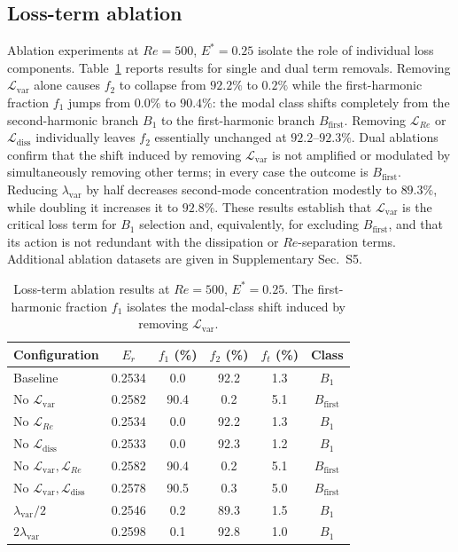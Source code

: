 \documentclass[a4paper,11pt]{article}
\begin{document}
\subsection{Loss-term ablation}
\label{sec:ablation}

Ablation experiments at \(Re=500\), \(E^*=0.25\) isolate the role of individual
loss components. Table~\ref{tab:loss_ablation} reports results for single and dual
term removals. Removing \(\mathcal{L}_{\mathrm{var}}\) alone causes \(f_2\) to
collapse from \(92.2\%\) to \(0.2\%\) while the first-harmonic fraction \(f_1\)
jumps from \(0.0\%\) to \(90.4\%\): the modal class shifts completely from the
second-harmonic branch \(B_1\) to the first-harmonic branch
\(B_{\mathrm{first}}\). Removing \(\mathcal{L}_{Re}\) or
\(\mathcal{L}_{\mathrm{diss}}\) individually leaves \(f_2\) essentially unchanged
at \(92.2\)--\(92.3\%\). Dual ablations confirm that the shift induced by removing
\(\mathcal{L}_{\mathrm{var}}\) is not amplified or modulated by simultaneously
removing other terms; in every case the outcome is \(B_{\mathrm{first}}\). Reducing
\(\lambda_{\mathrm{var}}\) by half decreases second-mode concentration modestly to
\(89.3\%\), while doubling it increases it to \(92.8\%\). These results establish
that \(\mathcal{L}_{\mathrm{var}}\) is the critical loss term for \(B_1\) selection
and, equivalently, for excluding \(B_{\mathrm{first}}\), and that its action is not
redundant with the dissipation or \(Re\)-separation terms. Additional ablation
datasets are given in Supplementary Sec.~S5.

\begin{table}[t]
\centering
\caption{Loss-term ablation results at \(Re=500\), \(E^*=0.25\). The
first-harmonic fraction \(f_1\) isolates the modal-class shift induced by removing
\(\mathcal{L}_{\mathrm{var}}\).}
\label{tab:loss_ablation}
\small
\begin{tabular}{lccccc}
\toprule
Configuration & \(E_r\) & \(f_1\) (\%) & \(f_2\) (\%) & \(f_t\) (\%) & Class\\
\midrule
Baseline & 0.2534 & 0.0 & 92.2 & 1.3 & \(B_1\)\\
No \(\mathcal{L}_{\mathrm{var}}\) & 0.2582 & 90.4 & 0.2 & 5.1 & \(B_{\mathrm{first}}\)\\
No \(\mathcal{L}_{Re}\) & 0.2534 & 0.0 & 92.2 & 1.3 & \(B_1\)\\
No \(\mathcal{L}_{\mathrm{diss}}\) & 0.2533 & 0.0 & 92.3 & 1.2 & \(B_1\)\\
No \(\mathcal{L}_{\mathrm{var}},\mathcal{L}_{Re}\) & 0.2582 & 90.4 & 0.2 & 5.1 & \(B_{\mathrm{first}}\)\\
No \(\mathcal{L}_{\mathrm{var}},\mathcal{L}_{\mathrm{diss}}\) & 0.2578 & 90.5 & 0.3 & 5.0 & \(B_{\mathrm{first}}\)\\
\(\lambda_{\mathrm{var}}/2\) & 0.2546 & 0.2 & 89.3 & 1.5 & \(B_1\)\\
\(2\lambda_{\mathrm{var}}\) & 0.2598 & 0.1 & 92.8 & 1.0 & \(B_1\)\\
\bottomrule
\end{tabular}
\end{table}
\end{document}
